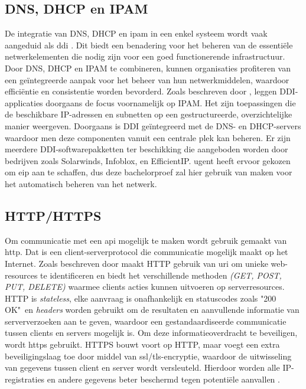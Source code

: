 \subsection{DNS, DHCP en IPAM}
De integratie van DNS, DHCP en \acrshort{ipam} in een enkel systeem wordt vaak aangeduid als \acrshort{ddi} \autocite{Fontein2023}. Dit biedt een benadering voor het beheren van de essentiële netwerkelementen die nodig zijn voor een goed functionerende infrastructuur. Door DNS, DHCP en IPAM te combineren, kunnen organisaties profiteren van een geïntegreerde aanpak voor het beheer van hun netwerkmiddelen, waardoor efficiëntie en consistentie worden bevorderd. Zoals beschreven door \textcite{Fontein2023}, leggen DDI-applicaties doorgaans de focus voornamelijk op IPAM. Het zijn toepassingen die de beschikbare IP-adressen en subnetten op een gestructureerde, overzichtelijke manier weergeven. Doorgaans is DDI geïntegreerd met de DNS- en DHCP-servers waardoor men deze componenten vanuit een centrale plek kan beheren. Er zijn meerdere DDI-softwarepakketten ter beschikking die aangeboden worden door bedrijven zoals Solarwinds, Infoblox, en EfficientIP. \acrshort{ugent} heeft ervoor gekozen om \acrlong{eip} aan te schaffen, dus deze bachelorproef zal hier gebruik van maken voor het automatisch beheren van het netwerk.

\subsection{HTTP/HTTPS}
Om communicatie met een \acrshort{api} mogelijk te maken wordt gebruik gemaakt van \acrfull{http}. Dat is een client-serverprotocol die communicatie mogelijk maakt op het Internet. Zoals beschreven door \textcite{Fielding2014} maakt HTTP gebruik van \acrfull{uri} om unieke web-resources te identificeren en biedt het verschillende methoden \textit{(GET, POST, PUT, DELETE)} waarmee clients acties kunnen uitvoeren op serverresources. HTTP is \textit{stateless}, elke aanvraag is onafhankelijk en statuscodes zoals "200 OK"\ en \textit{headers} worden gebruikt om de resultaten en aanvullende informatie van serververzoeken aan te geven, waardoor een gestandaardiseerde communicatie tussen clients en servers mogelijk is.
Om deze informatieoverdracht te beveiligen, wordt \acrfull{https} gebruikt. HTTPS bouwt voort op HTTP, maar voegt een extra beveiligingslaag toe door middel van \acrshort{ssl}/\acrshort{tls}-encryptie, waardoor de uitwisseling van gegevens tussen client en server wordt versleuteld. Hierdoor worden alle IP-registraties en andere gegevens beter beschermd tegen potentiële aanvallen \autocite{Rescorla2000}.

